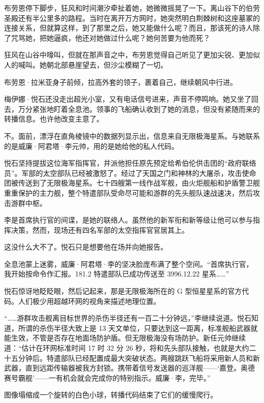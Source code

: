 \documentclass[AutoFakeBold=true]{book}
\begin{document}
布劳恩停下脚步，狂风和时间潮汐牵扯着她，她微微摇晃了一下。离山谷下的伯劳圣殿还有半公里多的路程。当时在离开万方网时，她突然明白荆棘树和这座墓冢的连接关系，但就算这样，到了那里之后，她又能做什么呢？而且，那该死的诗人除了咒骂她，把她逼疯，他还对她做过什么呢？她何苦要为他而死？

狂风在山谷中嚎叫，但就在那声音之中，布劳恩觉得自己听见了更加尖锐、更加似人的喊叫。她朝北部悬崖望去，但沙尘模糊了一切。

布劳恩·拉米亚身子前倾，拉高外套的领子，裹着自己，继续朝风中行进。

\vspace*{1em}

梅伊娜·悦石还没走出超光小室，又有电话信号进来，声音不停鸣响。她又坐了回去，万分紧张地盯着全息池。领事的飞船确认收到了她的消息，但没有紧随而来的转播信息。也许他改变主意了。

不。面前，漂浮在直角棱镜中的数据列显示出，信息来自无限极海星系。与她联系的是威廉·阿君塔·李元帅，用的是她给他的私人代码。

悦石坚持提拔这位海军指挥官，并派他担任原先预定给希伯伦供击团的``政府联络员''。军部的太空部队已经被激怒了。经过了天国之门和神林的大屠杀，攻击使命团被传送到了无限极海星系。七十四艘第一线作战军舰，由火炬舰船和护盾警卫舰重重保护的主力舰，整个特遣部队受命尽可能和游群的先头舰队速战速决，然后攻击游群中枢。

李是首席执行官的间谍，是她的联络人。虽然他的新军衔和新等级让他可以参与指挥决策，然而，现场还有四名军部的太空指挥官官居其上。

这没什么大不了。悦石只是想要他在场并向她报告。

全息池蒙上迷雾，威廉·阿君塔·李的坚决脸庞布满了整个空间。``首席执行官，我开始按命令作汇报。181.2 特遣部队已成功传送至 3996.12.22 星系……''

悦石惊讶地眨眨眼，然后记起来，那是无限极海所在的 G 型恒星星系的官方代码。人们极少用超越环网的视角来描述地理位置。

``……游群攻击舰离目标世界的杀伤半径还有一百二十分钟远，''李继续说道。悦石知道，所谓的杀伤半径大致上是 13 天文单位，只要达到这一距离，标准舰船武器就能生效，不管是否存在地面场防护盾。但无限极海没有场防护。新任元帅继续道：``估计在环网标准时间 17 时 32 分 26 秒，将和先头部队接触，也就是大约二十五分钟后。特遣部队已经配置成最大突破状态。两艘跳跃飞船将采用新人员和新武器，直到远距传输器被我方封锁。携带着信号发送器的巡洋舰——`嘉登。奥德赛号霸舰'——一有机会就会完成你的特别指示。威廉·李，完毕。''

图像塌缩成一个旋转的白色小球，转播代码结束了它们的缓慢爬行。
\end{document}
